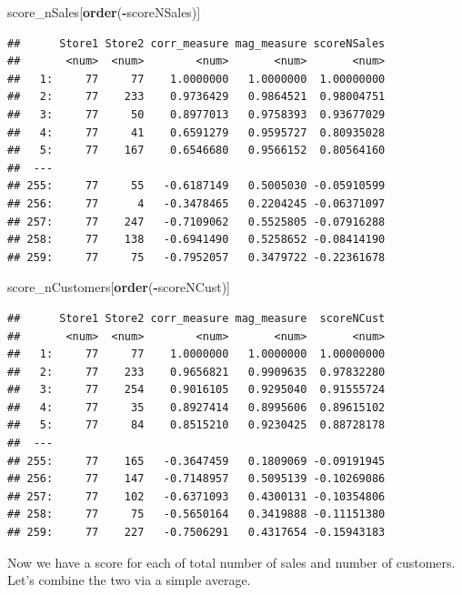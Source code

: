 \documentclass[
]{article}
\newenvironment{Shaded}{\begin{snugshade}}{\end{snugshade}}
\newcommand{\FunctionTok}[1]{\textcolor[rgb]{0.13,0.29,0.53}{\textbf{#1}}}
\newcommand{\NormalTok}[1]{#1}
\newcommand{\SpecialCharTok}[1]{\textcolor[rgb]{0.81,0.36,0.00}{\textbf{#1}}}
\begin{document}
\begin{Shaded}
\begin{Highlighting}[]
\NormalTok{score\_nSales[}\FunctionTok{order}\NormalTok{(}\SpecialCharTok{{-}}\NormalTok{scoreNSales)]}
\end{Highlighting}
\end{Shaded}

\begin{verbatim}
##      Store1 Store2 corr_measure mag_measure scoreNSales
##       <num>  <num>        <num>       <num>       <num>
##   1:     77     77    1.0000000   1.0000000  1.00000000
##   2:     77    233    0.9736429   0.9864521  0.98004751
##   3:     77     50    0.8977013   0.9758393  0.93677029
##   4:     77     41    0.6591279   0.9595727  0.80935028
##   5:     77    167    0.6546680   0.9566152  0.80564160
##  ---                                                   
## 255:     77     55   -0.6187149   0.5005030 -0.05910599
## 256:     77      4   -0.3478465   0.2204245 -0.06371097
## 257:     77    247   -0.7109062   0.5525805 -0.07916288
## 258:     77    138   -0.6941490   0.5258652 -0.08414190
## 259:     77     75   -0.7952057   0.3479722 -0.22361678
\end{verbatim}

\begin{Shaded}
\begin{Highlighting}[]
\NormalTok{score\_nCustomers[}\FunctionTok{order}\NormalTok{(}\SpecialCharTok{{-}}\NormalTok{scoreNCust)]}
\end{Highlighting}
\end{Shaded}

\begin{verbatim}
##      Store1 Store2 corr_measure mag_measure  scoreNCust
##       <num>  <num>        <num>       <num>       <num>
##   1:     77     77    1.0000000   1.0000000  1.00000000
##   2:     77    233    0.9656821   0.9909635  0.97832280
##   3:     77    254    0.9016105   0.9295040  0.91555724
##   4:     77     35    0.8927414   0.8995606  0.89615102
##   5:     77     84    0.8515210   0.9230425  0.88728178
##  ---                                                   
## 255:     77    165   -0.3647459   0.1809069 -0.09191945
## 256:     77    147   -0.7148957   0.5095139 -0.10269086
## 257:     77    102   -0.6371093   0.4300131 -0.10354806
## 258:     77     75   -0.5650164   0.3419888 -0.11151380
## 259:     77    227   -0.7506291   0.4317654 -0.15943183
\end{verbatim}

Now we have a score for each of total number of sales and number of
customers. Let's combine the two via a simple average.
\end{document}
